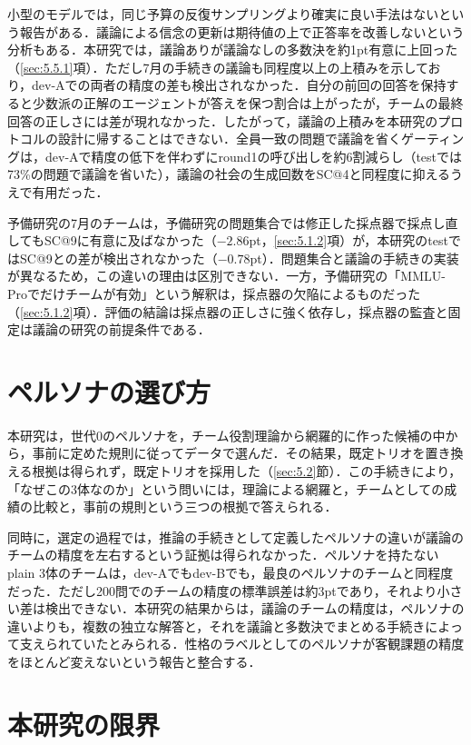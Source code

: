 小型のモデルでは，同じ予算の反復サンプリングより確実に良い手法はないという報告がある\cite{mirzaei2026samplemore}．議論による信念の更新は期待値の上で正答率を改善しないという分析もある\cite{choi2025debate}．本研究では，議論ありが議論なしの多数決を約1pt有意に上回った（\ref{sec:5.5.1}項）．ただし7月の手続きの議論も同程度以上の上積みを示しており，dev-Aでの両者の精度の差も検出されなかった．自分の前回の回答を保持すると少数派の正解のエージェントが答えを保つ割合は上がったが，チームの最終回答の正しさには差が現れなかった．したがって，議論の上積みを本研究のプロトコルの設計に帰することはできない．全員一致の問題で議論を省くゲーティングは，dev-Aで精度の低下を伴わずにround1の呼び出しを約6割減らし（testでは73\%の問題で議論を省いた），議論の社会の生成回数をSC@4と同程度に抑えるうえで有用だった．

予備研究の7月のチームは，予備研究の問題集合では修正した採点器で採点し直してもSC@9に有意に及ばなかった（$-2.86$pt，\ref{sec:5.1.2}項）が，本研究のtestではSC@9との差が検出されなかった（$-0.78$pt）．問題集合と議論の手続きの実装が異なるため，この違いの理由は区別できない．一方，予備研究の「MMLU-Proでだけチームが有効」という解釈は，採点器の欠陥によるものだった（\ref{sec:5.1.2}項）．評価の結論は採点器の正しさに強く依存し，採点器の監査と固定は議論の研究の前提条件である．

\section{ペルソナの選び方}
\label{sec:6.4}

本研究は，世代0のペルソナを，チーム役割理論から網羅的に作った候補の中から，事前に定めた規則に従ってデータで選んだ．その結果，既定トリオを置き換える根拠は得られず，既定トリオを採用した（\ref{sec:5.2}節）．この手続きにより，「なぜこの3体なのか」という問いには，理論による網羅と，チームとしての成績の比較と，事前の規則という三つの根拠で答えられる．

同時に，選定の過程では，推論の手続きとして定義したペルソナの違いが議論のチームの精度を左右するという証拠は得られなかった．ペルソナを持たないplain 3体のチームは，dev-Aでもdev-Bでも，最良のペルソナのチームと同程度だった．ただし200問でのチームの精度の標準誤差は約3ptであり，それより小さい差は検出できない．本研究の結果からは，議論のチームの精度は，ペルソナの違いよりも，複数の独立な解答と，それを議論と多数決でまとめる手続きによって支えられていたとみられる．性格のラベルとしてのペルソナが客観課題の精度をほとんど変えないという報告\cite{zheng2024persona}と整合する．

\section{本研究の限界}
\label{sec:6.5}

